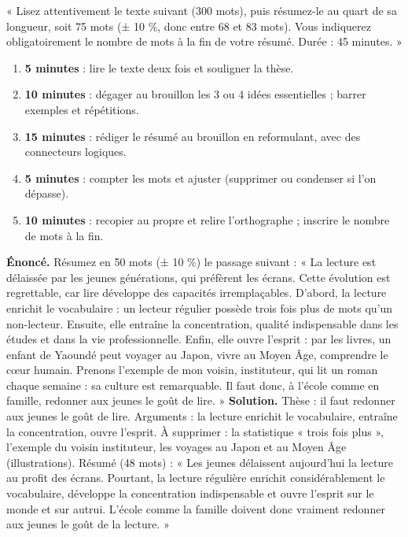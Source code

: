 \documentclass[11pt]{article}
\newcommand{\cle}[1]{{\popxbold\color{popdark}#1}}
\newcounter{popsec}
\newcounter{popsub}
\newcommand{\courssub}[1]{%
  \stepcounter{popsub}%
  \par\vspace{9pt}\noindent{\popxbold\fontsize{11.5}{13}\selectfont\color{popink}{\color{poporange}\thepopsec.\thepopsub}\hspace{6pt}#1}\par\nopagebreak\vspace{4pt}
}
\begin{document}
\courssub{Entraînement en conditions d'examen}

\begin{exemplebox}
« Lisez attentivement le texte suivant (300 mots), puis résumez-le \cle{au quart de sa longueur}, soit 75 mots (± 10 \%, donc entre 68 et 83 mots). Vous indiquerez obligatoirement le nombre de mots à la fin de votre résumé. Durée : 45 minutes. »
\end{exemplebox}

\begin{methode}
\begin{enumerate}
\item \textbf{5 minutes} : lire le texte deux fois et souligner la thèse.
\item \textbf{10 minutes} : dégager au brouillon les 3 ou 4 idées essentielles ; barrer exemples et répétitions.
\item \textbf{15 minutes} : rédiger le résumé au brouillon en reformulant, avec des connecteurs logiques.
\item \textbf{5 minutes} : compter les mots et ajuster (supprimer ou condenser si l'on dépasse).
\item \textbf{10 minutes} : recopier au propre et relire l'orthographe ; inscrire le nombre de mots à la fin.
\end{enumerate}
\end{methode}

\begin{exoresolu}
\textbf{Énoncé.} Résumez en 50 mots (± 10 \%) le passage suivant : « La lecture est délaissée par les jeunes générations, qui préfèrent les écrans. Cette évolution est regrettable, car lire développe des capacités irremplaçables. D'abord, la lecture enrichit le vocabulaire : un lecteur régulier possède trois fois plus de mots qu'un non-lecteur. Ensuite, elle entraîne la concentration, qualité indispensable dans les études et dans la vie professionnelle. Enfin, elle ouvre l'esprit : par les livres, un enfant de Yaoundé peut voyager au Japon, vivre au Moyen Âge, comprendre le cœur humain. Prenons l'exemple de mon voisin, instituteur, qui lit un roman chaque semaine : sa culture est remarquable. Il faut donc, à l'école comme en famille, redonner aux jeunes le goût de lire. »
\tcblower
\textbf{Solution.} Thèse : il faut redonner aux jeunes le goût de lire. Arguments : la lecture enrichit le vocabulaire, entraîne la concentration, ouvre l'esprit. À supprimer : la statistique « trois fois plus », l'exemple du voisin instituteur, les voyages au Japon et au Moyen Âge (illustrations). Résumé (48 mots) : « Les jeunes délaissent aujourd'hui la lecture au profit des écrans. Pourtant, la lecture régulière enrichit considérablement le vocabulaire, développe la concentration indispensable et ouvre l'esprit sur le monde et sur autrui. L'école comme la famille doivent donc vraiment redonner aux jeunes le goût de la lecture. »
\end{exoresolu}
\end{document}
